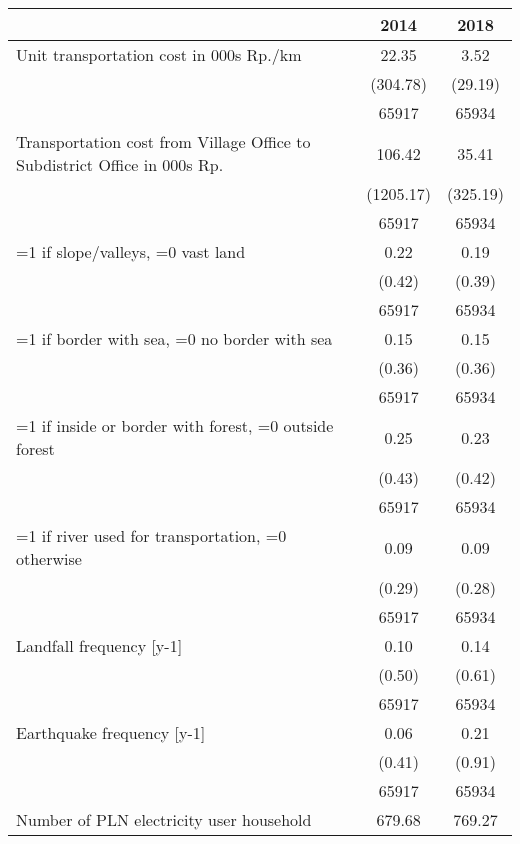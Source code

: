 \begin{tabular}{l*{2}{c}}
\hline\hline
                    &        2014&        2018\\
\hline
Unit transportation cost in 000s Rp./km&       22.35&        3.52\\
                    &    (304.78)&     (29.19)\\
                    &       65917&       65934\\
[1em]
Transportation cost from Village Office to Subdistrict Office in 000s Rp.&      106.42&       35.41\\
                    &   (1205.17)&    (325.19)\\
                    &       65917&       65934\\
[1em]
=1 if slope/valleys, =0 vast land&        0.22&        0.19\\
                    &      (0.42)&      (0.39)\\
                    &       65917&       65934\\
[1em]
=1 if border with sea, =0 no border with sea&        0.15&        0.15\\
                    &      (0.36)&      (0.36)\\
                    &       65917&       65934\\
[1em]
=1 if inside or border with forest, =0 outside forest&        0.25&        0.23\\
                    &      (0.43)&      (0.42)\\
                    &       65917&       65934\\
[1em]
=1 if river used for transportation, =0 otherwise&        0.09&        0.09\\
                    &      (0.29)&      (0.28)\\
                    &       65917&       65934\\
[1em]
Landfall frequency [y-1]&        0.10&        0.14\\
                    &      (0.50)&      (0.61)\\
                    &       65917&       65934\\
[1em]
Earthquake frequency [y-1]&        0.06&        0.21\\
                    &      (0.41)&      (0.91)\\
                    &       65917&       65934\\
[1em]
Number of PLN electricity user household&      679.68&      769.27\\

\end{tabular}

